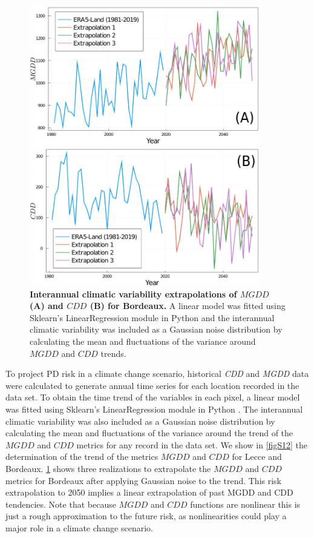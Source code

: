 \begin{figure}[H]
    \centering

    \includegraphics[width=0.9\textwidth]{Figures/MGDD_CDD_scenarios.png}
    \caption[Interannual climatic variability extrapolations of
        $MGDD$ and $CDD$]{\textbf{Interannual climatic
            variability extrapolations of
            $MGDD$	(A) and $CDD$ (B) for Bordeaux.} A linear model was
        fitted using
        Sklearn's LinearRegression module in Python and the interannual
        climatic
        variability was included as a Gaussian noise distribution by
        calculating the
        mean and fluctuations of the variance around $MGDD$ and $CDD$ trends.}
    \label{figS13} %
\end{figure}

To project PD risk in a climate change scenario, historical \textit{CDD}
and \textit{MGDD} data were calculated to generate annual time series for each
location recorded in the data set. To obtain the time trend of the variables in
each pixel, a linear model was fitted using Sklearn's LinearRegression module
in Python \cite{scikit-learn}. The interannual climatic variability was also
included as a Gaussian noise distribution by calculating the mean and
fluctuations of the variance around the trend of the $MGDD$ and $CDD$ metrics
for any record in the data set. We show in \cref{figS12} the determination of
the trend of the metrics $MGDD$ and $CDD$ for Lecce and Bordeaux. \cref{figS13}
shows three realizations to extrapolate the $MGDD$ and $CDD$ metrics for
Bordeaux after applying Gaussian noise to the trend. This risk extrapolation to
2050 implies a linear extrapolation of past MGDD and CDD tendencies. Note that
because $MGDD$ and $CDD$ functions are nonlinear this is just a rough
approximation to the future risk, as nonlinearities could play a major role in
a climate change scenario.

